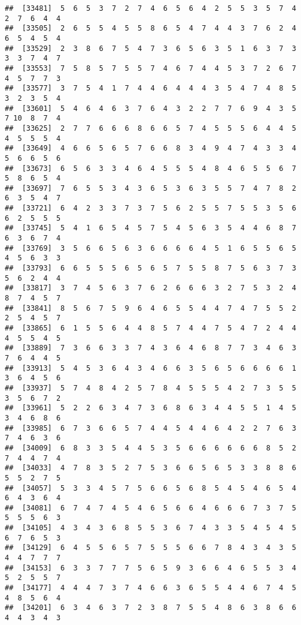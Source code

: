 \documentclass[
]{book}
\begin{document}
\begin{verbatim}
##  [33481]  5  6  5  3  7  2  7  4  6  5  6  4  2  5  5  3  5  7  4  2  7  6  4  4
##  [33505]  2  6  5  5  4  5  5  8  6  5  4  7  4  4  3  7  6  2  4  6  5  4  5  4
##  [33529]  2  3  8  6  7  5  4  7  3  6  5  6  3  5  1  6  3  7  3  3  3  7  4  7
##  [33553]  7  5  8  5  7  5  5  7  4  6  7  4  4  5  3  7  2  6  7  4  5  7  7  3
##  [33577]  3  7  5  4  1  7  4  4  6  4  4  4  3  5  4  7  4  8  5  3  2  3  5  4
##  [33601]  5  4  6  4  6  3  7  6  4  3  2  2  7  7  6  9  4  3  5  7 10  8  7  4
##  [33625]  2  7  7  6  6  6  8  6  6  5  7  4  5  5  5  6  4  4  5  4  5  5  5  4
##  [33649]  4  6  6  5  6  5  7  6  6  8  3  4  9  4  7  4  3  3  4  5  6  6  5  6
##  [33673]  6  5  6  3  3  4  6  4  5  5  5  4  8  4  6  5  5  6  7  5  8  6  5  4
##  [33697]  7  6  5  5  3  4  3  6  5  3  6  3  5  5  7  4  7  8  2  6  3  5  4  7
##  [33721]  6  4  2  3  3  7  3  7  5  6  2  5  5  7  5  5  3  5  6  6  2  5  5  5
##  [33745]  5  4  1  6  5  4  5  7  5  4  5  6  3  5  4  4  6  8  7  6  3  6  7  4
##  [33769]  3  5  6  6  5  6  3  6  6  6  6  4  5  1  6  5  5  6  5  4  5  6  3  3
##  [33793]  6  6  5  5  5  6  5  6  5  7  5  5  8  7  5  6  3  7  3  5  6  2  4  4
##  [33817]  3  7  4  5  6  3  7  6  2  6  6  6  3  2  7  5  3  2  4  8  7  4  5  7
##  [33841]  8  5  6  7  5  9  6  4  6  5  5  4  4  7  4  7  5  5  2  2  5  4  5  7
##  [33865]  6  1  5  5  6  4  4  8  5  7  4  4  7  5  4  7  2  4  4  4  5  5  4  5
##  [33889]  7  3  6  6  3  3  7  4  3  6  4  6  8  7  7  3  4  6  3  7  6  4  4  5
##  [33913]  5  4  5  3  6  4  3  4  6  6  3  5  6  5  6  6  6  6  1  3  6  4  5  6
##  [33937]  5  7  4  8  4  2  5  7  8  4  5  5  5  4  2  7  3  5  5  3  5  6  7  2
##  [33961]  5  2  2  6  3  4  7  3  6  8  6  3  4  4  5  5  1  4  5  3  4  6  8  6
##  [33985]  6  7  3  6  6  5  7  4  4  5  4  4  6  4  2  2  7  6  3  7  4  6  3  6
##  [34009]  6  8  3  3  5  4  4  5  3  5  6  6  6  6  6  6  8  5  2  7  4  4  7  4
##  [34033]  4  7  8  3  5  2  7  5  3  6  6  5  6  5  3  3  8  8  6  5  5  2  7  5
##  [34057]  5  3  3  4  5  7  5  6  6  5  6  8  5  4  5  4  6  5  4  6  4  3  6  4
##  [34081]  6  7  4  7  4  5  4  6  5  6  6  4  6  6  6  7  3  7  5  5  5  5  6  3
##  [34105]  4  3  4  3  6  8  5  5  3  6  7  4  3  3  5  4  5  4  5  6  7  6  5  3
##  [34129]  6  4  5  5  6  5  7  5  5  5  6  6  7  8  4  3  4  3  5  4  4  7  7  7
##  [34153]  6  3  3  7  7  7  5  6  5  9  3  6  6  4  6  5  5  3  4  5  2  5  5  7
##  [34177]  4  4  4  7  3  7  4  6  6  3  6  5  5  4  4  6  7  4  5  4  8  5  6  4
##  [34201]  6  3  4  6  3  7  2  3  8  7  5  5  4  8  6  3  8  6  6  4  4  3  4  3

\end{verbatim}
\end{document}

